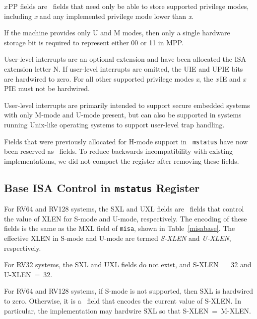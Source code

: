 {\em x}\,PP fields are \wlrl\ fields that need only be able to store
supported privilege modes, including {\em x} and any implemented
privilege mode lower than {\em x}.

\begin{commentary}
If the machine provides only U and M modes, then only a single
hardware storage bit is required to represent either 00 or 11 in MPP.
\end{commentary}

User-level interrupts are an optional extension and have been
allocated the ISA extension letter N.
If user-level interrupts are omitted, the
UIE and UPIE bits are hardwired to zero.  For all other supported
privilege modes {\em x}, the {\em x}\,IE and {\em x}\,PIE must not
be hardwired.

\begin{commentary}
User-level interrupts are primarily intended to support secure
embedded systems with only M-mode and U-mode present, but can also be
supported in systems running Unix-like operating systems to support
user-level trap handling.
\end{commentary}

\begin{commentary}
Fields that were previously allocated for H-mode support in {\tt
  mstatus} have now been reserved as \wpri\ fields.  To reduce
backwards incompatibility with existing implementations, we did not
compact the register after removing these fields.
\end{commentary}

\subsection{Base ISA Control in {\tt mstatus} Register}

For RV64 and RV128 systems, the SXL and UXL fields are \warl\ fields
that control the value of XLEN for S-mode and U-mode,
respectively. The encoding of these fields is the same as the MXL
field of {\tt misa}, shown in Table~\ref{misabase}.  The effective
XLEN in S-mode and U-mode are termed {\em S-XLEN} and {\em U-XLEN},
respectively.

For RV32 systems, the SXL and UXL fields do not exist, and
S-XLEN~=~32 and U-XLEN~=~32.

For RV64 and RV128 systems, if S-mode is not supported, then SXL is hardwired
to zero.  Otherwise, it is a \warl\ field that encodes the current value of
S-XLEN.  In particular, the implementation may hardwire SXL so that
S-XLEN~=~M-XLEN.

